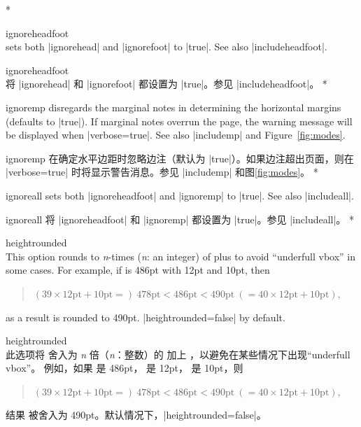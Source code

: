 \begin{Options}
\begin{paracol}{2}
\switchcolumn[0]*
\item[ignoreheadfoot]~\\ sets both |ignorehead| and |ignorefoot|
   to |true|. See also |includeheadfoot|.
   \switchcolumn
   \item[ignoreheadfoot] ~\\ 将 |ignorehead| 和 |ignorefoot| 都设置为 |true|。参见 |includeheadfoot|。
\switchcolumn[0]*
\item[ignoremp] disregards the marginal notes in determining the
   horizontal margins (defaults to |true|). If marginal notes overrun
   the page, the warning message will be displayed when |verbose=true|.
   See also |includemp| and Figure~\ref{fig:modes}.
   \switchcolumn
   \item[ignoremp] 在确定水平边距时忽略边注（默认为 |true|）。如果边注超出页面，则在 |verbose=true| 时将显示警告消息。参见 |includemp| 和图\ref{fig:modes}。
\switchcolumn[0]*
\item[ignoreall] sets both |ignoreheadfoot| and |ignoremp| to |true|. 
   See also |includeall|.
   \switchcolumn
   \item[ignoreall] 将 |ignoreheadfoot| 和 |ignoremp| 都设置为 |true|。参见 |includeall|。
\switchcolumn[0]*
\item[heightrounded]~\\
   This option rounds  to \textit{n}-times (\textit{n}:
   an integer) of  plus  to avoid 
   ``underfull vbox'' in some cases. For example, if  is
   486pt with  12pt and  10pt, then
   \begin{quote}
     $(39\times12\textrm{pt}+10\textrm{pt}=)\: 478\textrm{pt}
      < 486\textrm{pt} < 
     490\textrm{pt} \:(=40\times12\textrm{pt}+10\textrm{pt})$,
   \end{quote}
   as a result  is rounded to 490pt. |heightrounded=false|
   by default.
   \switchcolumn
   \item[heightrounded] ~\\
此选项将  舍入为 \textit{n} 倍（\textit{n}：整数）的  加上 ，以避免在某些情况下出现``underfull vbox''。
例如，如果  是 486pt， 是 12pt， 是 10pt，则
\begin{quote}
    $(39\times12\textrm{pt}+10\textrm{pt}=)\: 478\textrm{pt}
     < 486\textrm{pt} < 
    490\textrm{pt} \:(=40\times12\textrm{pt}+10\textrm{pt})$,
  \end{quote}
结果  被舍入为 490pt。默认情况下，|heightrounded=false|。
\end{paracol}
\end{Options}

